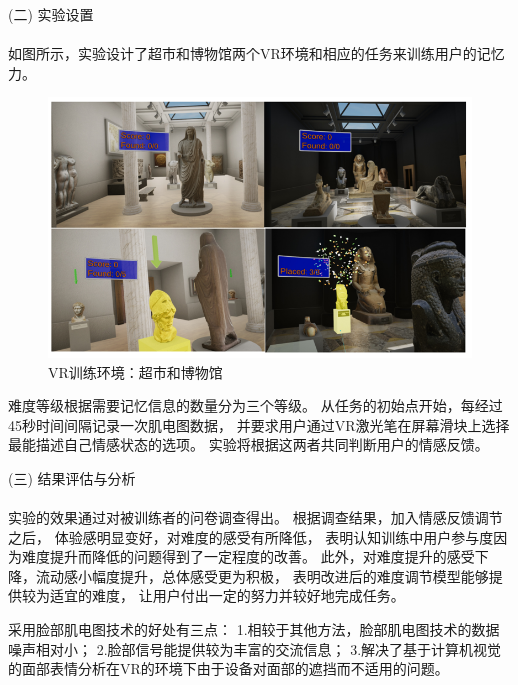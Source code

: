 \documentclass[12pt]{article}
\begin{document}
            (二) 实验设置\paragraph{}
            如图所示，实验设计了超市和博物馆两个VR环境和相应的任务来训练用户的记忆力。
            \begin{figure}[H]
            	
            	\centering
            	\includegraphics[scale=0.8]{images/VR.png}
            	\caption{VR训练环境：超市和博物馆\cite{ref15}}
            	\label{fig:label}
            \end{figure}
            难度等级根据需要记忆信息的数量分为三个等级。
            从任务的初始点开始，每经过45秒时间间隔记录一次肌电图数据，
            并要求用户通过VR激光笔在屏幕滑块上选择最能描述自己情感状态的选项。
            实验将根据这两者共同判断用户的情感反馈。

            (三) 结果评估与分析\paragraph{}
            实验的效果通过对被训练者的问卷调查得出。
            根据调查结果，加入情感反馈调节之后，
            体验感明显变好，对难度的感受有所降低，
            表明认知训练中用户参与度因为难度提升而降低的问题得到了一定程度的改善。
            此外，对难度提升的感受下降，流动感小幅度提升，总体感受更为积极，
            表明改进后的难度调节模型能够提供较为适宜的难度，
            让用户付出一定的努力并较好地完成任务。

            采用脸部肌电图技术的好处有三点：
            1.相较于其他方法，脸部肌电图技术的数据噪声相对小；
            2.脸部信号能提供较为丰富的交流信息；
            3.解决了基于计算机视觉的面部表情分析在VR的环境下由于设备对面部的遮挡而不适用的问题。
\end{document}
